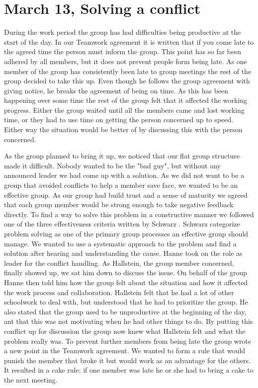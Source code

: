 \section{March 13, Solving a conflict}


During the work period the group has had difficulties being productive at the start of the day. In our Teamwork agreement it is written that if you come late to the agreed time the person must inform the group. This point has so far been adhered by all members, but it does not prevent people form being late. As one member of the group has consistently been late to group meetings the rest of the group decided to take this up. Even though he follows the group agreement with giving notice, he breaks the agreement of being on time. As this has been happening over some time the rest of the group felt that it affected the working progress. Either the group waited until all the members came and lost working time, or they had to use time on getting the person concerned up to speed. Either way the situation would be better of by discussing this with the person concerned.

As the group planned to bring it up, we noticed that our flat group structure made it difficult. Nobody wanted to be the "bad guy", but without any announced leader we had come up with a solution. As we did not want to be a group that avoided conflicts to help a member save face, we wanted to be an effective group. As our group had build trust and a sense of maturity we agreed that each group member would be strong enough to take negative feedback directly. To find a way to solve this problem in a constructive manner we followed one of the three effectiveness criteria written by Schwarz \cite{WorkGroups}. Schwarz \cite{WorkGroups} categorize problem solving as one of the primary group processes an effective group should manage. We wanted to use a systematic approach to the problem and find a solution after hearing and understanding the cause. Hanne took on the role as leader for the conflict handling. As Hallstein, the group member concerned, finally showed up, we sat him down to discuss the issue. On behalf of the group Hanne then told him how the group felt about the situation and how it affected the work process and collaboration. Hallstein felt that he had a lot of other schoolwork to deal with, but understood that he had to prioritize the group. He also stated that the group used to be unproductive at the beginning of the day, ant that this was not motivating when he had other things to do. By putting this conflict up for discussion the group now knew what Hallstein felt and what the problem really was. To prevent further members from being late the group wrote a new point in the Teamwork agreement. We wanted to form a rule that would punish the member that broke it but would work as an advantage for the others. It resulted in a cake rule; if one member was late he or she had to bring a cake to the next meeting. 

